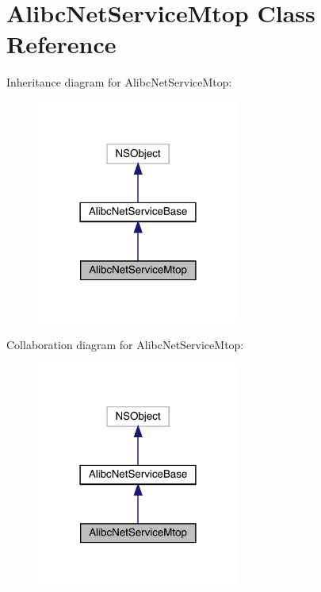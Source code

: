 \hypertarget{interface_alibc_net_service_mtop}{}\section{Alibc\+Net\+Service\+Mtop Class Reference}
\label{interface_alibc_net_service_mtop}


Inheritance diagram for Alibc\+Net\+Service\+Mtop\+:\nopagebreak
\begin{figure}[H]
\begin{center}
\leavevmode
\includegraphics[width=189pt]{interface_alibc_net_service_mtop__inherit__graph}
\end{center}
\end{figure}


Collaboration diagram for Alibc\+Net\+Service\+Mtop\+:\nopagebreak
\begin{figure}[H]
\begin{center}
\leavevmode
\includegraphics[width=189pt]{interface_alibc_net_service_mtop__coll__graph}
\end{center}
\end{figure}
